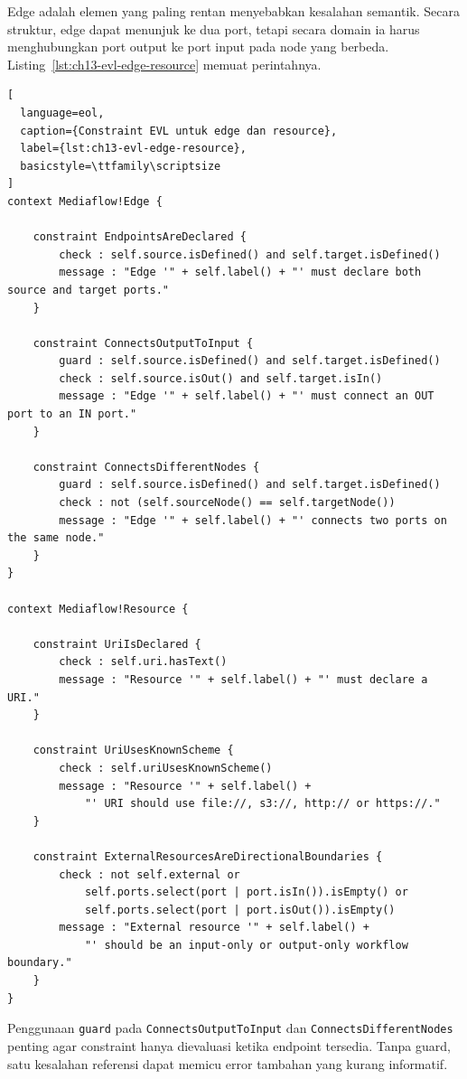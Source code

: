 Edge adalah elemen yang paling rentan menyebabkan kesalahan semantik. Secara struktur, edge dapat menunjuk ke dua port, tetapi secara domain ia harus menghubungkan port output ke port input pada node yang berbeda. Listing~\ref{lst:ch13-evl-edge-resource} memuat perintahnya.

\begin{lstlisting}[
  language=eol,
  caption={Constraint EVL untuk edge dan resource},
  label={lst:ch13-evl-edge-resource},
  basicstyle=\ttfamily\scriptsize
]
context Mediaflow!Edge {

    constraint EndpointsAreDeclared {
        check : self.source.isDefined() and self.target.isDefined()
        message : "Edge '" + self.label() + "' must declare both source and target ports."
    }

    constraint ConnectsOutputToInput {
        guard : self.source.isDefined() and self.target.isDefined()
        check : self.source.isOut() and self.target.isIn()
        message : "Edge '" + self.label() + "' must connect an OUT port to an IN port."
    }

    constraint ConnectsDifferentNodes {
        guard : self.source.isDefined() and self.target.isDefined()
        check : not (self.sourceNode() == self.targetNode())
        message : "Edge '" + self.label() + "' connects two ports on the same node."
    }
}

context Mediaflow!Resource {

    constraint UriIsDeclared {
        check : self.uri.hasText()
        message : "Resource '" + self.label() + "' must declare a URI."
    }

    constraint UriUsesKnownScheme {
        check : self.uriUsesKnownScheme()
        message : "Resource '" + self.label() +
            "' URI should use file://, s3://, http:// or https://."
    }

    constraint ExternalResourcesAreDirectionalBoundaries {
        check : not self.external or
            self.ports.select(port | port.isIn()).isEmpty() or
            self.ports.select(port | port.isOut()).isEmpty()
        message : "External resource '" + self.label() +
            "' should be an input-only or output-only workflow boundary."
    }
}
\end{lstlisting}

\noindent Penggunaan \texttt{guard} pada \texttt{ConnectsOutputToInput} dan \texttt{ConnectsDifferentNodes} penting agar constraint hanya dievaluasi ketika endpoint tersedia. Tanpa guard, satu kesalahan referensi dapat memicu error tambahan yang kurang informatif.

